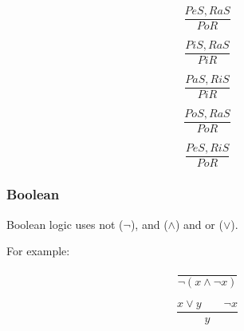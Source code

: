 \documentclass{article}
\begin{document}
\begin{center}
	\begin{minipage}{0.3\linewidth}
	\begin{equation}
		\frac{PeS,RaS}{PoR}
	\end{equation}
	\end{minipage}
	\begin{minipage}{0.3\linewidth}
	\begin{equation}
		\frac{PiS,RaS}{PiR}
	\end{equation}
	\end{minipage}
	\begin{minipage}{0.3\linewidth}
	\begin{equation}
		\frac{PaS,RiS}{PiR}
	\end{equation}
	\end{minipage}
\end{center}

\begin{center}
	\begin{minipage}{0.3\linewidth}
	\begin{equation}
		\frac{PoS,RaS}{PoR}
	\end{equation}
	\end{minipage}
	\begin{minipage}{0.3\linewidth}
	\begin{equation}
		\frac{PeS,RiS}{PoR}
	\end{equation}
	\end{minipage}
\end{center}

\subsubsection{Boolean}

Boolean logic uses not ($\neg$), and ($\wedge$) and or ($\vee$).

For example:

\begin{center}
	\begin{minipage}{0.3\linewidth}
	\begin{displaymath}
		\frac{}{\neg(x \wedge \neg x)}
	\end{displaymath}
	\end{minipage}
	\begin{minipage}{0.3\linewidth}
	\begin{displaymath}
		\frac{x \vee y \qquad \neg x}{y}
	\end{displaymath}
	\end{minipage}
\end{center}
\end{document}
